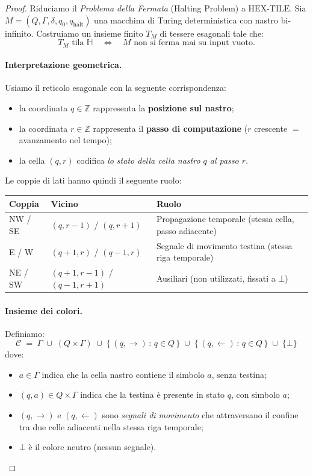 \documentclass[12pt, a4paper]{article}
\newcommand{\moveR}{\!\rightarrow\!}
\newcommand{\moveL}{\!\leftarrow\!}
\begin{document}
\begin{proof}
Riduciamo il \emph{Problema della Fermata} (Halting Problem) a $\mathrm{HEX\text{-}TILE}$.
Sia $M = (Q, \Gamma, \delta, q_0, q_{\mathrm{halt}})$ una macchina di Turing deterministica
con nastro bi-infinito. Costruiamo un insieme finito $T_M$ di tessere esagonali tale che:
\[
  T_M \text{ tila } \mathbb{H}
  \quad\iff\quad
  M \text{ non si ferma mai su input vuoto.}
\]

\paragraph{Interpretazione geometrica.}
Usiamo il reticolo esagonale con la seguente corrispondenza:
\begin{itemize}
  \item la coordinata $q \in \mathbb{Z}$ rappresenta la \textbf{posizione sul nastro};
  \item la coordinata $r \in \mathbb{Z}$ rappresenta il \textbf{passo di computazione}
        ($r$ crescente $=$ avanzamento nel tempo);
  \item la cella $(q, r)$ codifica \emph{lo stato della cella nastro $q$ al passo $r$}.
\end{itemize}
Le coppie di lati hanno quindi il seguente ruolo:
\begin{center}
\renewcommand{\arraystretch}{1.3}
\begin{tabular}{lll}
\hline
Coppia & Vicino & Ruolo \\
\hline
NW / SE & $(q, r-1)$ / $(q, r+1)$ & Propagazione temporale (stessa cella, passo adiacente) \\
E / W   & $(q+1, r)$ / $(q-1, r)$ & Segnale di movimento testina (stessa riga temporale) \\
NE / SW & $(q+1,r-1)$ / $(q-1,r+1)$ & Ausiliari (non utilizzati, fissati a $\bot$) \\
\hline
\end{tabular}
\end{center}

\paragraph{Insieme dei colori.}
Definiamo:
\[
  \mathcal{C} \;=\; \Gamma
    \;\cup\; (Q \times \Gamma)
    \;\cup\; \{\,(q, \moveR)\,:\, q \in Q\,\}
    \;\cup\; \{\,(q, \moveL)\,:\, q \in Q\,\}
    \;\cup\; \{\bot\}
\]
dove:
\begin{itemize}
  \item $a \in \Gamma$ indica che la cella nastro contiene il simbolo $a$, senza testina;
  \item $(q, a) \in Q \times \Gamma$ indica che la testina è presente in stato $q$, con simbolo $a$;
  \item $(q, \moveR)$ e $(q, \moveL)$ sono \emph{segnali di movimento} che attraversano il confine
        tra due celle adiacenti nella stessa riga temporale;
  \item $\bot$ è il colore neutro (nessun segnale).
\end{itemize}


\end{proof}
\end{document}
